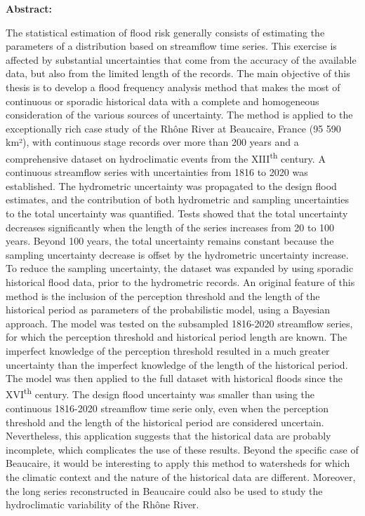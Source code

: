 \vfill

\noindent \textbf{Abstract:}

\noindent \small{ The statistical estimation of flood risk generally consists of estimating the parameters of a distribution based on streamflow time series. This exercise is affected by substantial uncertainties that come from the accuracy of the available data, but also from the limited length of the records. The main objective of this thesis is to develop a flood frequency analysis method that makes the most of continuous or sporadic historical data with a complete and homogeneous consideration of the various sources of uncertainty. The method is applied to the exceptionally rich case study of the Rhône River at Beaucaire, France (95 590 km²), with continuous stage records over more than 200 years and a comprehensive dataset on hydroclimatic events from the XIII\textsuperscript{th} century. A continuous streamflow series with uncertainties from 1816 to 2020 was established. The hydrometric uncertainty was propagated to the design flood estimates, and the contribution of both hydrometric and sampling uncertainties to the total uncertainty was quantified. Tests showed that the total uncertainty decreases significantly when the length of the series increases from 20 to 100 years. Beyond 100 years, the total uncertainty remains constant because the sampling uncertainty decrease is offset by the hydrometric uncertainty increase. To reduce the sampling uncertainty, the dataset was expanded by using sporadic historical flood data, prior to the hydrometric records. An original feature of this method is the inclusion of the perception threshold and the length of the historical period as parameters of the probabilistic model, using a Bayesian approach. The model was tested on the subsampled 1816-2020 streamflow series, for which the perception threshold and historical period length are known. The imperfect knowledge of the perception threshold resulted in a much greater uncertainty than the imperfect knowledge of the length of the historical period. The model was then applied to the full dataset with historical floods since the XVI\textsuperscript{th} century. The design flood uncertainty was smaller than using 
the continuous 1816-2020 streamflow time serie only, even when the perception threshold and the length of
the historical period are considered uncertain. Nevertheless, this application suggests that the historical data are probably incomplete, which complicates the use of these results. Beyond the specific case of Beaucaire,
it would be interesting to apply this method to watersheds for which the climatic context and the nature of the
historical data are different. Moreover, the long series reconstructed in Beaucaire could also be used to study the hydroclimatic variability of the Rhône River.}

